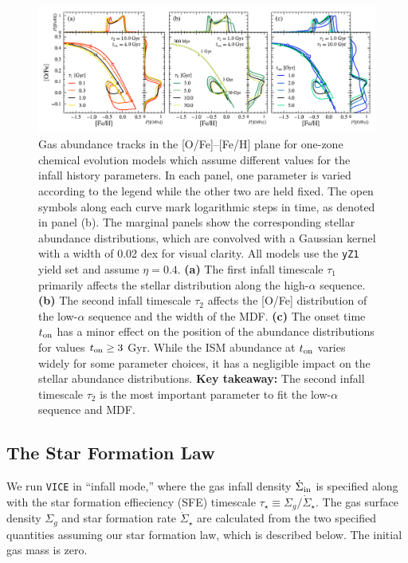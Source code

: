 \documentclass[twocolumn,twocolappendix,linenumbers]{aastex631}
\begin{document}
\begin{figure}
    \centering
    \includegraphics{figures/onezone_params.pdf}
    \caption{Gas abundance tracks in the [O/Fe]--[Fe/H] plane for one-zone chemical evolution models which assume different values for the infall history parameters. In each panel, one parameter is varied according to the legend while the other two are held fixed. The open symbols along each curve mark logarithmic steps in time, as denoted in panel (b). The marginal panels show the corresponding stellar abundance distributions, which are convolved with a Gaussian kernel with a width of 0.02 dex for visual clarity. All models use the {\tt yZ1} yield set and assume $\eta=0.4$. {\bf (a)} The first infall timescale $\tau_1$ primarily affects the stellar distribution along the high-$\alpha$ sequence. {\bf (b)} The second infall timescale $\tau_2$ affects the [O/Fe] distribution of the low-$\alpha$ sequence and the width of the MDF. {\bf (c)} The onset time $t_{\rm on}$ has a minor effect on the position of the abundance distributions for values $t_{\rm on}\ge 3$ Gyr. While the ISM abundance at $t_{\rm on}$ varies widely for some parameter choices, it has a negligible impact on the stellar abundance distributions. {\bf Key takeaway:} The second infall timescale $\tau_2$ is the most important parameter to fit the low-$\alpha$ sequence and MDF.}
    \label{fig:twoinfall-parameters-low-yields}
\end{figure}

\subsection{The Star Formation Law}

We run {\tt VICE} in ``infall mode,'' where the gas infall density $\dot\Sigma_{\rm in}$ is specified along with the star formation effieciency (SFE) timescale $\tau_\star\equiv \Sigma_g / \dot\Sigma_\star$. The gas surface density $\Sigma_g$ and star formation rate $\dot\Sigma_\star$ are calculated from the two specified quantities assuming our star formation law, which is described below. The initial gas mass is zero.
\end{document}
